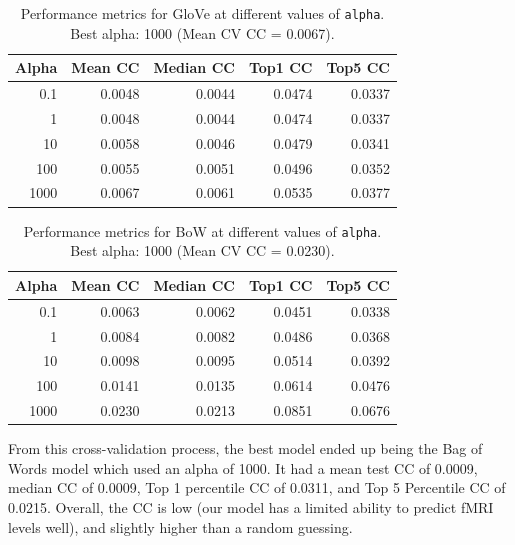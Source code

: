 \documentclass[10pt,letterpaper]{article}
\begin{document}
\begin{table}[ht]
\centering
\caption{Performance metrics for GloVe at different values of \texttt{alpha}. Best alpha: 1000 (Mean CV CC = 0.0067).}
\label{tab:glove_cv}
\begin{tabular}{rrrrr}
\toprule
\textbf{Alpha} & \textbf{Mean CC} & \textbf{Median CC} & \textbf{Top1 CC} & \textbf{Top5 CC} \\
\midrule
0.1    & 0.0048 & 0.0044 & 0.0474 & 0.0337 \\
1      & 0.0048 & 0.0044 & 0.0474 & 0.0337 \\
10     & 0.0058 & 0.0046 & 0.0479 & 0.0341 \\
100    & 0.0055 & 0.0051 & 0.0496 & 0.0352 \\
1000   & 0.0067 & 0.0061 & 0.0535 & 0.0377 \\
\bottomrule
\end{tabular}
\end{table}

\begin{table}[ht]
\centering
\caption{Performance metrics for BoW at different values of \texttt{alpha}. Best alpha: 1000 (Mean CV CC = 0.0230).}
\label{tab:bow_cv}
\begin{tabular}{rrrrr}
\toprule
\textbf{Alpha} & \textbf{Mean CC} & \textbf{Median CC} & \textbf{Top1 CC} & \textbf{Top5 CC} \\
\midrule
0.1    & 0.0063 & 0.0062 & 0.0451 & 0.0338 \\
1      & 0.0084 & 0.0082 & 0.0486 & 0.0368 \\
10     & 0.0098 & 0.0095 & 0.0514 & 0.0392 \\
100    & 0.0141 & 0.0135 & 0.0614 & 0.0476 \\
1000   & 0.0230 & 0.0213 & 0.0851 & 0.0676 \\
\bottomrule
\end{tabular}
\end{table}




From this cross-validation process, the best model ended up being the Bag of Words model which used an alpha of 1000. It had a mean test CC of 0.0009, median CC of 0.0009, Top 1 percentile CC of 0.0311, and Top 5 Percentile CC of 0.0215. Overall, the CC is low (our model has a limited ability to predict fMRI levels well), and slightly higher than a random guessing.
\end{document}
